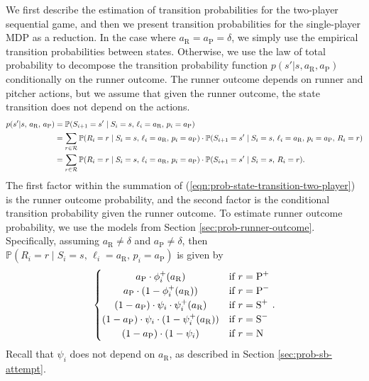 \documentclass[11pt]{article}
\begin{document}
      We first describe the estimation of transition probabilities for the two-player sequential game, and then we present transition probabilities for the single-player MDP as a reduction. In the case where $a_\text{R} = a_\text{P} = \delta$, we simply use the empirical transition probabilities between states. Otherwise, we use the law of total probability to decompose the transition probability function $p(s'|s,a_\text{R},a_\text{P})$ conditionally on the runner outcome. The runner outcome depends on runner and pitcher actions, but we assume that given the runner outcome, the state transition does not depend on the actions.
      \begin{align}
        \label{eqn:prob-state-transition-two-player}
        p(s'|s,\, a_\text{R},\, a_\text{P}) &= \mathbb{P}(S_{i+1} = s' \mid S_i = s,\, \ell_i = a_\text{R},\, p_i = a_\text{P}) \notag\\
          &= \sum_{r \in \mathcal{R}} \mathbb{P}(R_i = r \mid S_i = s,\, \ell_i = a_\text{R},\, p_i = a_\text{P}) \cdot \mathbb{P}(S_{i+1} = s' \mid S_i = s,\, \ell_i = a_\text{R},\, p_i = a_\text{P},\, R_i = r) \notag\\
          &= \sum_{r \in \mathcal{R}} \mathbb{P}(R_i = r \mid S_i = s,\, \ell_i = a_\text{R},\, p_i = a_\text{P}) \cdot \mathbb{P}(S_{i+1} = s' \mid S_i = s,\, R_i = r).
      \end{align}
      The first factor within the summation of (\ref{eqn:prob-state-transition-two-player}) is the runner outcome probability, and the second factor is the conditional transition probability given the runner outcome. To estimate runner outcome probability, we use the models from Section \ref{sec:prob-runner-outcome}. Specifically, assuming $a_\text{R} \ne \delta$ and $a_\text{P} \ne \delta$, then $\mathbb{P}(R_i = r \mid S_i = s,\, \ell_i = a_\text{R},\, p_i = a_\text{P})$ is given by
      \begin{align}
        \label{eqn:prob-runner-outcome-two-player}
        \begin{split}
          \begin{cases}
              \hfil a_\text{P} \cdot \phi_i^+(a_\text{R})                             & \mbox{if } r = \mbox{P}^+\\
              \hfil a_\text{P} \cdot (1 - \phi_i^+(a_\text{R}))                       & \mbox{if } r = \mbox{P}^-\\
              \hfil (1 - a_\text{P}) \cdot \psi_i \cdot \psi_i^+(a_\text{R})         & \mbox{if } r = \mbox{S}^+\\
              \hfil (1 - a_\text{P}) \cdot \psi_i \cdot (1 - \psi_i^+(a_\text{R}))   & \mbox{if } r = \mbox{S}^-\\
              \hfil (1 - a_\text{P}) \cdot (1 - \psi_i)                        & \mbox{if } r = \mbox{N}\\
          \end{cases}.
        \end{split}
      \end{align}
      Recall that $\psi_i$ does not depend on $a_\text{R}$, as described in Section \ref{sec:prob-sb-attempt}.
\end{document}
